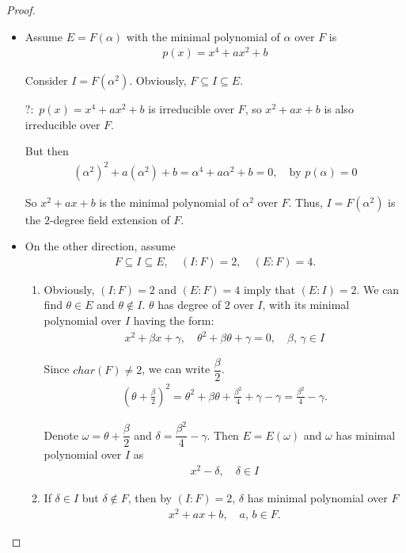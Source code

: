 \documentclass[utf8]{ctexbook}
\begin{document}
\begin{proof}
\begin{itemize}
\item{Assume $E=F(\alpha)$ with the minimal polynomial of $\alpha$ over $F$ is
\begin{align*}
p(x) = x^4 + ax^2 + b
\end{align*}

Consider $I = F(\alpha^2)$. Obviously, $F \subseteq I \subseteq E$.

{\color{red} $?:$ $p(x) = x^4 + ax^2 + b $ is irreducible over $F$, so $x^2 + ax + b$ is also irreducible over $F$.}

But then
\begin{align*}
(\alpha^2)^2 + a (\alpha^2) + b = \alpha^4 + a \alpha^2 + b = 0, \quad \mbox{by } p(\alpha) = 0
\end{align*}

So $x^2 + a x + b $ is the minimal polynomial of $\alpha^2$ over $F$. Thus, $I = F(\alpha^2)$ is the 
$2$-degree field extension of $F$.
}
\item{On the other direction, assume 
\begin{align*}
F \subseteq I \subseteq E, \quad (I:F)=2, \quad (E:F)=4 .
\end{align*}


\begin{enumerate}
\item{Obviously, $(I:F)=2$ and $(E:F)=4$ imply that $(E:I) = 2$. We can find $\theta \in E$ and $\theta \not \in I$. $\theta $ has degree of $2$ over $I$, with its minimal polynomial over $I$ having the form:
\begin{align*}
x^2 + \beta x + \gamma , \quad \theta ^2 + \beta \theta + \gamma = 0, \quad \beta, \, \gamma \in I
\end{align*}

Since $char(F) \neq 2$, we can write $\dfrac{\beta}{2}$.
\begin{align*}
(\theta + \frac{\beta}{2})^2 = \theta^2 + \beta \theta + \frac{\beta^2}{4} + \gamma - \gamma = \frac{\beta^2}{4} - \gamma .
\end{align*}

Denote $\omega = \theta + \dfrac{\beta}{2}$ and $\delta = \dfrac{\beta^2}{4} - \gamma$. Then $E = E(\omega)$ and $\omega$ has minimal polynomial over $I$ as 
\begin{align*}
x^2 - \delta , \quad \delta \in I
\end{align*}
}
\item{\label{exercise_4_3_3_step2}If $\delta \in I$ but $\delta \not \in F$, then by $(I:F)=2$, $\delta$ has minimal polynomial over $F$ 
\begin{align*}
x^2 + a x + b, \quad a, \, b \in F .
\end{align*}

}
\end{enumerate}}
\end{itemize}
\end{proof}
\end{document}
